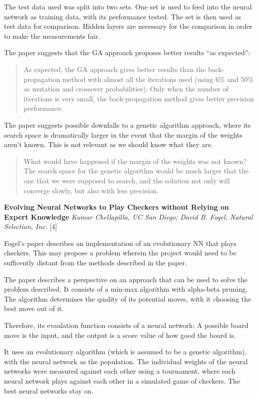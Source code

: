 \documentclass[]{article}
\begin{document}
The test data used was split into two sets. One set is used to feed into
the neural network as training data, with its performance tested. The
set is then used as test data for comparison. Hidden layers are
necessary for the comparison in order to make the measurements fair.

The paper suggests that the GA approach proposes better results ``as
expected'':

\begin{quote}
As expected, the GA approach gives better results than the
back-propagation method with almost all the iterations used (using 6\%
and 50\% as mutation and crossover probabilities). Only when the number
of iterations is very small, the back-propagation method gives better
precision performance.
\end{quote}

The paper suggests possible downfalls to a genetic algorithm approach,
where its search space is dramatically larger in the event that the
margin of the weights aren't known. This is not relevant as we should
know what they are.

\begin{quote}
What would have happened if the margin of the weights was not known? The
search space for the genetic algorithm would be much larger that the one
that we were supposed to search, and the solution not only will converge
slowly, but also with less precision.
\end{quote}

\textbf{Evolving Neural Networks to Play Checkers without Relying on
Expert Knowledge} \emph{Kumar Chellapilla, UC San Diego; David B. Fogel,
Natural Selection, Inc.} {[}4{]}

Fogel's paper describes an implementation of an evolutionary NN that
plays checkers. This may propose a problem wherein the project would
need to be sufficently distant from the methods described in the paper.

The paper describes a perspective on an approach that can be used to
solve the problem described. It consists of a min-max algorithm with
alpha-beta pruning. The algorithm determines the quality of its
potential moves, with it choosing the best move out of it.

Therefore, its evaulation function consists of a neural network: A
possible board move is the input, and the output is a score value of how
good the board is.

It uses an evolutionary algorithm (which is assumed to be a genetic
algorithm), with the neural network as the population. The individual
weights of the neural networks were measured against each other using a
tournament, where each neural network plays against each other in a
simulated game of checkers. The best neural networks stay on.
\end{document}
